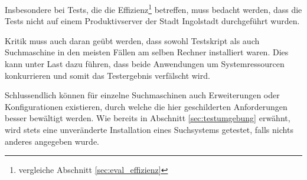 Insbesondere bei Tests, die die Effizienz\footnote{vergleiche Abschnitt \ref{sec:eval_effizienz}} betreffen, muss bedacht werden, dass die Tests nicht auf einem Produktivserver der Stadt Ingolstadt durchgeführt wurden.

Kritik muss auch daran geübt werden, dass sowohl Testskript als auch Suchmaschine in den meisten Fällen am selben Rechner installiert waren. Dies kann unter Last dazu führen, dass beide Anwendungen um Systemressourcen konkurrieren und somit das Testergebnis verfälscht wird.

Schlussendlich können für einzelne Suchmaschinen auch Erweiterungen oder Konfigurationen existieren, durch welche die hier geschilderten Anforderungen besser bewältigt werden. Wie bereits in Abschnitt \ref{sec:testumgebung} erwähnt, wird stets eine unveränderte Installation eines Suchsystems getestet, falls nichts anderes angegeben wurde.


